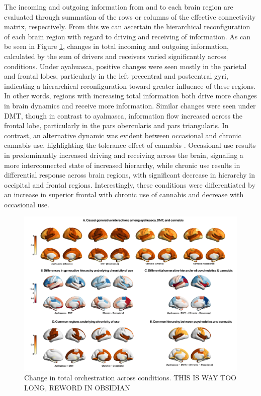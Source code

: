 The incoming and outgoing information from and to each brain region are
evaluated through summation of the rows or columns of the effective
connectivity matrix, respectively. From this we can ascertain the
hierarchical reconfiguration of each brain region with regard to driving
and receiving of information. As can be seen in Figure \ref{fig:gecrender}, changes in
total incoming and outgoing information, calculated by the sum of
drivers and receivers varied significantly across conditions. Under
ayahuasca, positive changes were seen mostly in the parietal and frontal
lobes, particularly in the left precentral and postcentral gyri,
indicating a hierarchical reconfiguration toward greater influence of
these regions. In other words, regions with increasing total information
both drive more changes in brain dynamics and receive more information.
Similar changes were seen under DMT, though in contrast to ayahuasca,
information flow increased across the frontal lobe, particularly in the
pars obercularis and pars triangularis. In contrast, an alternative
dynamic was evident between occasional and chronic cannabis use,
highlighting the tolerance effect of cannabis \parencite{Ramaekers2022,Ramaekers2020}. Occasional use results in
predominantly increased driving and receiving across the brain,
signaling a more interconnected state of increased hierarchy, while
chronic use results in differential response across brain regions, with
significant decrease in hierarchy in occipital and frontal regions.
Interestingly, these conditions were differentiated by an increase in
superior frontal with chronic use of cannabis and decrease with
occasional use.

\begin{figure}[h]
    \centering
    \includegraphics[width=\textwidth]{images/Figure 3_ GEC.png}
    \caption[Change in total orchestration across conditions]{Change in total orchestration across conditions. THIS IS WAY TOO LONG, REWORD IN OBSIDIAN}
    \label{fig:gecrender}
\end{figure}

